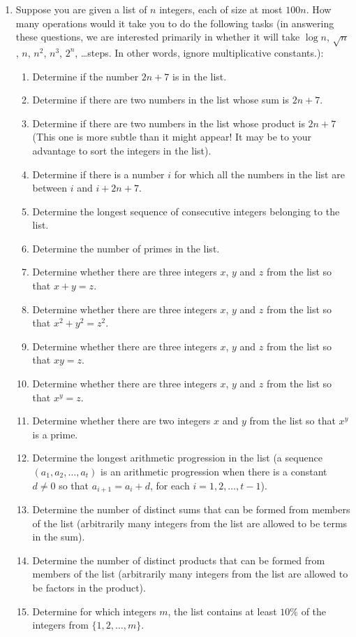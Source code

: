 \begin{enumerate}
\item  Suppose you are given a list of $n$ integers, each of size
at most $100n$.   How many operations would it take you to do the following
tasks (in answering these questions, we are interested primarily in whether it
will take $\log n$, $\sqrt{n}$, $n$, $n^2$, $n^3$, $2^n$, \dots steps.  In 
other words, ignore multiplicative constants.):

\begin{enumerate} 
\item Determine if the number $2n+7$ is in the list.
\item Determine if there are two numbers in the list whose sum is
$2n+7$.
\item Determine if there are two numbers in the list whose product is
$2n+7$ (This one is more subtle than it might appear!  It may be
to your advantage to sort the integers in the list).
\item Determine if there is a number $i$ for which all the numbers in
the list are between $i$ and $i+2n+7$. 
\item Determine  the longest sequence of consecutive integers belonging
to the list.
\item Determine the number of primes in the list. 
\item Determine whether there are three integers $x$, $y$ and $z$ from
the list so that $x+y=z$.
\item Determine whether there are three integers $x$, $y$ and $z$ from
the list so that $x^2+y^2=z^2$.
\item Determine whether there are three integers $x$, $y$ and $z$ from
the list so that $xy=z$.
\item Determine whether there are three integers $x$, $y$ and $z$ from
the list so that $x^y=z$.
\item Determine whether there are two integers $x$ and $y$ from
the list so that $x^y$ is a prime.
\item Determine the longest arithmetic progression in the list (a
sequence $(a_1, a_2,\dots,a_t)$ is an arithmetic progression when
there is a constant $d\neq 0$ so that $a_{i+1}=a_i+d$, for each $i=1,2,
\dots, t-1$).
\item Determine the number of distinct sums that can be formed from
members of the list (arbitrarily many integers from the list are allowed to
be terms in the sum).
\item Determine the number of distinct products that can be formed from
members of the list (arbitrarily many integers from the list are allowed to be
factors in the product).
\item Determine for which integers $m$, the list contains at least $10\%$ of the
integers from $\{1,2,\dots,m\}$.


\end{enumerate}
\end{enumerate}
